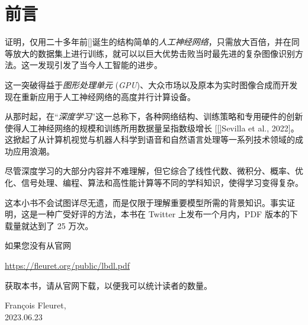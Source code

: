 \documentclass[oneside,11pt]{memoir}
\begin{document}
\newpage


{
\everymath{\color{black}}
\tableofcontents %
}

\clearpage

\listoffigures*
{}


\chapter*{前言}

\citep{nips-1502.c399862d3b9d6b76c8436e924a68c45b} 证明，仅用二十多年前[\cite[LeCun et al., 1989]{lecun-89e}]诞生的结构简单的\emph{人工神经网络}，只需放大百倍，并在同等放大的数据集上进行训练，就可以以巨大优势击败当时最先进的复杂图像识别方法。这一发现引发了当今人工智能的进步。

这一突破得益于\emph{图形处理单元} (\emph{GPU})、大众市场以及原本为实时图像合成而开发现在重新应用于人工神经网络的高度并行计算设备。

从那时起，在``\emph{深度学习}''这一总称下，各种网络结构、训练策略和专用硬件的创新使得人工神经网络的规模和训练所用数据量呈指数级增长 [\ref{}{Sevilla et al., 2022}]。这掀起了从计算机视觉与机器人科学到语音和自然语言处理等一系列技术领域的成功应用浪潮。

尽管深度学习的大部分内容并不难理解，但它综合了线性代数、微积分、概率、优化、信号处理、编程、算法和高性能计算等不同的学科知识，使得学习变得复杂。

这本小书不会试图详尽无遗，而是仅限于理解重要模型所需的背景知识。事实证明，这是一种广受好评的方法，本书在 Twitter 上发布一个月内，PDF 版本的下载量就达到了 25 万次。

如果您没有从官网 
\begin{center}
\href{https://fleuret.org/public/lbdl.pdf}{https://fleuret.org/public/lbdl.pdf}
\end{center}
获取本书，请从官网下载，以便我可以统计读者的数量。

\begin{flushright}
  François Fleuret,\\
  2023.06.23
\end{flushright}
\end{document}
